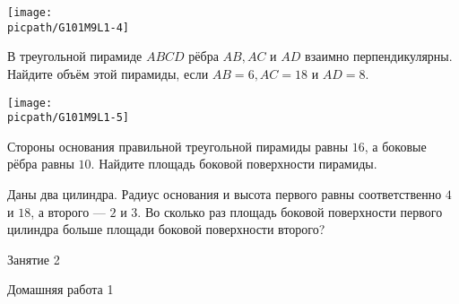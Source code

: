 \begin{class}[number=1]
\begin{listofex}
		\hspace{0.02\linewidth}
		\begin{minipage}[t]{\picwidth}
			\texttt{[image: \\picpath/G101M9L1-4]}
		\end{minipage}
		\item 
		\begin{minipage}[t]{\bodywidth}
			В треугольной пирамиде \(ABCD\) рёбра \(AB, AC\) и \(AD\) взаимно перпендикулярны. Найдите объём этой пирамиды, если \(AB = 6, AC = 18\) и \(AD = 8\).
		\end{minipage}
		\hspace{0.02\linewidth}
		\begin{minipage}[t]{\picwidth}
			\texttt{[image: \\picpath/G101M9L1-5]}
		\end{minipage}
		\newpage
		\item Стороны основания правильной треугольной пирамиды равны \(16\), а боковые рёбра равны \(10\). Найдите площадь боковой поверхности пирамиды.
		\item Даны два цилиндра. Радиус основания и высота первого равны соответственно \(4\) и \(18\), а второго --- \(2\) и \(3\). Во сколько раз площадь боковой поверхности первого цилиндра больше площади боковой поверхности второго?
		
		
	\end{listofex}
\end{class}

\begin{class}[number=2]
	\begin{listofex}
		\item Занятие 2
	\end{listofex}
\end{class}

\begin{homework}[number=1]
	\begin{listofex}
		\item Домашняя работа 1
	\end{listofex}
\end{homework}

